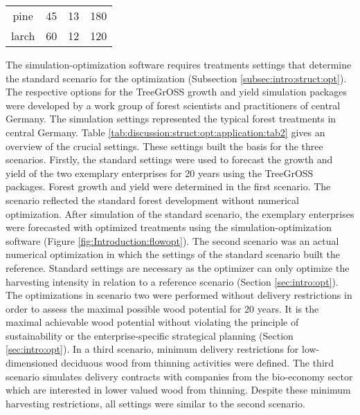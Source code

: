 \begin{table}[h]
\begin{tabular}{cccc}
		pine        & 45                                                                 & 13                                                                                  & 180                                                                                \\
		larch        & 60                                                                 & 12                                                                                  & 120                                                                                \\ \hline
	\end{tabular}
\end{table}

The si\-mu\-la\-tion-op\-ti\-mi\-za\-tion software requires treatments settings that determine the standard scenario for the optimization (Subsection \ref{subsec:intro:struct:opt}). The respective options for the TreeGrOSS growth and yield simulation packages were developed by a work group of forest scientists and practitioners of central Germany. The simulation settings represented the typical forest treatments in central Germany. Table \ref{tab:discussion:struct:opt:application:tab2} gives an overview of the crucial settings. These settings built the basis for the three scenarios. Firstly, the standard settings were used to forecast the growth and yield of the two exemplary enterprises for 20 years using the TreeGrOSS packages. Forest growth and yield were determined in the first scenario. The scenario reflected the standard forest development without numerical optimization. After simulation of the standard scenario, the exemplary enterprises were forecasted with optimized treatments using the si\-mu\-la\-tion-op\-ti\-mi\-za\-tion software (Figure \ref{fig:Introduction:flowopt}). The second scenario was an actual numerical optimization in which the settings of the standard scenario built the reference. Standard settings are necessary as the optimizer can only optimize the harvesting intensity in relation to a reference scenario (Section \ref{sec:intro:opt}). The optimizations in scenario two were performed without delivery restrictions in order to assess the maximal possible wood potential for 20 years. It is the maximal achievable wood potential without violating the principle of sustainability or the enterprise-specific strategical planning (Section \ref{sec:intro:opt}). In a third scenario, minimum delivery restrictions for low-dimensioned deciduous wood from thinning activities were defined. The third scenario simulates delivery contracts with companies from the bio-economy sector which are interested in lower valued wood from thinning. Despite these minimum harvesting restrictions, all settings were similar to the second scenario.

